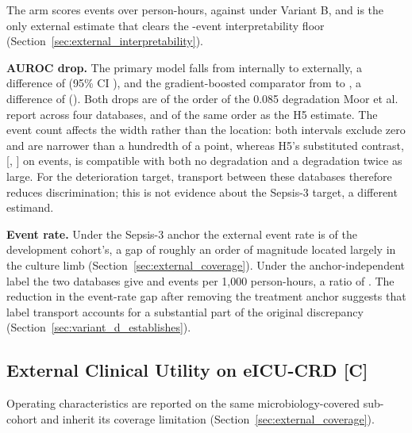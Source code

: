 The arm scores \pcExtAltNEvents{} events over \pcExtAltNRows{} person-hours,
against \pcExtNEventsB{} under Variant B, and is the only external estimate that
clears the \pcExtMinEvents-event interpretability floor
(Section~\ref{sec:external_interpretability}).

\textbf{AUROC drop.} The primary
model falls from \pcAltAurocFullPrimaryD{} internally to
\pcExtAltAurocPrimary{} externally, a difference of
\pcExtAltDropPrimary{} (95\% CI \pcExtAltDropCiPrimary), and the
gradient-boosted comparator from
\pcAltAurocFullGbtD{} to \pcExtAltAurocGbt, a difference of
\pcExtAltDropGbt{} (\pcExtAltDropCiGbt). Both drops are of the order of the
0.085 degradation Moor et al.\ \cite{moor2023review} report across four
databases, and of the same order as the H5 estimate. The event count affects
the width rather than the location: both intervals exclude zero and are
narrower than a hundredth of a point, whereas H5's substituted contrast,
\pcHFiveEst{} [\pcHFiveCiLo, \pcHFiveCiHi] on \pcExtNEventsB{} events, is
compatible with both no degradation and a degradation twice as large. For the
deterioration target, transport between these databases therefore reduces
discrimination; this is not evidence about the Sepsis-3 target, a different
estimand.

\textbf{Event rate.} Under the Sepsis-3 anchor the external event rate is
\pcExtRateRatioB{} of the development cohort's, a gap of roughly an order of
magnitude located largely in the culture limb
(Section~\ref{sec:external_coverage}). Under the anchor-independent label the
two databases give \pcExtAltRateMimic{} and \pcExtAltRateEicu{} events per
1{,}000 person-hours, a ratio of \pcExtAltRateRatio. The reduction in the
event-rate gap after removing the treatment anchor suggests that label
transport accounts for a substantial part of the original discrepancy
(Section~\ref{sec:variant_d_establishes}).

\subsection{External Clinical Utility on eICU-CRD \texorpdfstring{[C]}{[C]}}

Operating characteristics are reported on the same microbiology-covered
sub-cohort and inherit its coverage limitation
(Section~\ref{sec:external_coverage}).

